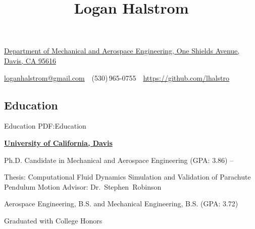 \documentclass[letterpaper,MMMyyyy,nonstop]{simpleresumecv}
\makeatletter
\newcommand{\CVAuthor}{Logan Halstrom}
\newcommand{\CVWebpage}{https://github.com/lhalstro}
\newcommand{\CVEmail}{loganhalstrom@gmail.com}
\makeatother
\begin{document}

\title{\CVAuthor}

\begin{subtitle}
\href{https://www.google.com/maps/place/1+Shields+Ave,+Davis,+CA+95616}
{Department of Mechanical and Aerospace Engineering, One Shields Avenue, Davis, CA 95616}
\par
\href{mailto:\CVEmail}
{\CVEmail}
\,\SubBulletSymbol\,
(530)\,965-0755
\,\SubBulletSymbol\,
\href{\CVWebpage}
{\CVWebpage}
\end{subtitle}

\begin{body}


\section
{Education}
{Education}
{PDF:Education}

\href{http://mae.ucdavis.edu/}
{\textbf{University of California, Davis}}

\GapNoBreak
\BulletItem
Ph.D. Candidate in
{Mechanical and Aerospace Engineering} (GPA: 3.86)
\hfill
{} --
\begin{detail}
\SubItem
Thesis:
{Computational Fluid Dynamics Simulation and Validation of Parachute Pendulum Motion}
\SubItem
Advisor:
Dr.~Stephen~Robinson
\end{detail}

\GapNoBreak
\BulletItem
Aerospace Engineering, B.S. and Mechanical Engineering, B.S. (GPA: 3.72)
\hfill
{}
\begin{detail}
\SubBulletItem
Graduated with College Honors
\end{detail}


\end{body}
\end{document}
